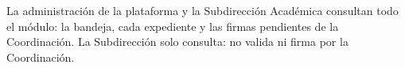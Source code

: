 \documentclass[11pt,a4paper]{article}
\begin{document}
{\small\tableofcontents}
\newpage
\begin{quevasahacer}
La administración de la plataforma y la Subdirección Académica consultan todo el módulo: la bandeja, cada expediente y las firmas pendientes de la Coordinación. La Subdirección solo consulta: no valida ni firma por la Coordinación.
\end{quevasahacer}



\end{document}
